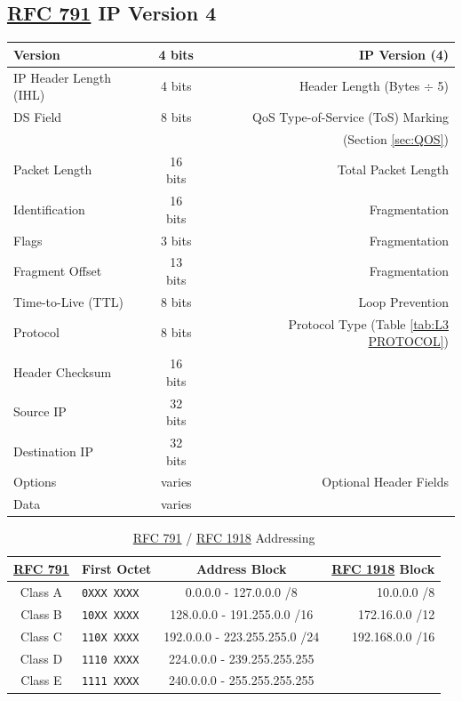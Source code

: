 \documentclass[12pt]{article}
\newcommand{\RFC}[1]{\href{https://datatracker.ietf.org/doc/html/rfc#1}{RFC #1}}
\begin{document}
	\subsection[RFC 791 IPv4]{\RFC{791} IP Version 4 \label{subsec:IPV4}}
	\begin{table}[H]
	\centering
	\begin{tabular}{| l | c | r |}
	\hline
	Version				& 4 bits	& IP Version (4)\\\hline
	IP Header Length (IHL)		& 4 bits	& Header Length (Bytes $\div$ 5)\\\hline
	DS Field				& 8 bits	& QoS Type-of-Service (ToS) Marking\\
						&		& (Section \ref{sec:QOS})\\\hline
	Packet Length			& 16 bits	& Total Packet Length\\\hline
	Identification			& 16 bits	& Fragmentation\\\hline
	Flags					& 3 bits	& Fragmentation\\\hline
	Fragment Offset			& 13 bits	& Fragmentation\\\hline
	Time-to-Live (TTL)		& 8 bits	& Loop Prevention\\\hline
	Protocol				& 8 bits	& Protocol Type (Table \ref{tab:L3 PROTOCOL})\\\hline
	Header Checksum		& 16 bits	&\\\hline
	Source IP				& 32 bits	&\\\hline
	Destination IP			& 32 bits	&\\\hline
	Options				& varies	& Optional Header Fields\\\hline
	Data					& varies	&\\\hline
	\end{tabular}\end{table}

	\begin{table}[H]
	\centering
	\caption{\RFC{791} / \RFC{1918} Addressing \label{tab:ADDRESSING IPV4}}
	\begin{tabular}{clcr}
	\hline
	\textbf{\RFC{791}}	& \textbf{First Octet}		& \textbf{Address Block}		& \textbf{\RFC{1918} Block}\\\hline
	Class A 			& \texttt{0XXX XXXX}		& 0.0.0.0 - 127.0.0.0 /8			& 10.0.0.0 /8\\
	Class B 			& \texttt{10XX XXXX}		& 128.0.0.0 - 191.255.0.0 /16		& 172.16.0.0 /12\\
	Class C 			& \texttt{110X XXXX}		& 192.0.0.0 - 223.255.255.0 /24 	& 192.168.0.0 /16\\\hline
	Class D 			& \texttt{1110 XXXX}		& 224.0.0.0 - 239.255.255.255		&\\\hline
	Class E 			& \texttt{1111 XXXX}		& 240.0.0.0 - 255.255.255.255		&\\\hline
	\end{tabular}\end{table}
\end{document}
